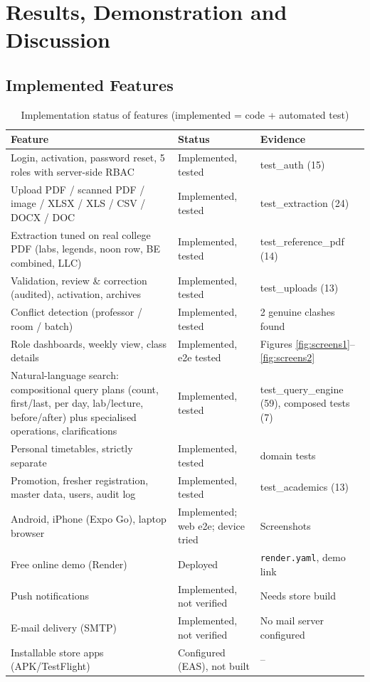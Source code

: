 \section{Results, Demonstration and Discussion}

\subsection{Implemented Features}
\begin{table}[H]
\centering
\caption{Implementation status of features (implemented = code + automated test)}
\label{tab:features}
\small
\begin{tabularx}{\textwidth}{@{}Xp{2.4cm}p{3.3cm}@{}}
\toprule
\textbf{Feature} & \textbf{Status} & \textbf{Evidence}\\
\midrule
Login, activation, password reset, 5 roles with server-side RBAC & Implemented, tested & test\_auth (15)\\
Upload PDF / scanned PDF / image / XLSX / XLS / CSV / DOCX / DOC & Implemented, tested & test\_extraction (24)\\
Extraction tuned on real college PDF (labs, legends, noon row, BE combined, LLC) & Implemented, tested & test\_reference\_pdf (14)\\
Validation, review \& correction (audited), activation, archives & Implemented, tested & test\_uploads (13)\\
Conflict detection (professor / room / batch) & Implemented, tested & 2 genuine clashes found\\
Role dashboards, weekly view, class details & Implemented, e2e tested & Figures \ref{fig:screens1}--\ref{fig:screens2}\\
Natural-language search: compositional query plans (count, first/last, per day, lab/lecture, before/after) plus specialised operations, clarifications & Implemented, tested & test\_query\_engine (59), composed tests (7)\\
Personal timetables, strictly separate & Implemented, tested & domain tests\\
Promotion, fresher registration, master data, users, audit log & Implemented, tested & test\_academics (13)\\
Android, iPhone (Expo Go), laptop browser & Implemented; web e2e; device tried & Screenshots\\
Free online demo (Render) & Deployed & \texttt{render.yaml}, demo link\\
Push notifications & Implemented, not verified & Needs store build\\
E-mail delivery (SMTP) & Implemented, not verified & No mail server configured\\
Installable store apps (APK/TestFlight) & Configured (EAS), not built & --\\
\bottomrule
\end{tabularx}
\end{table}

